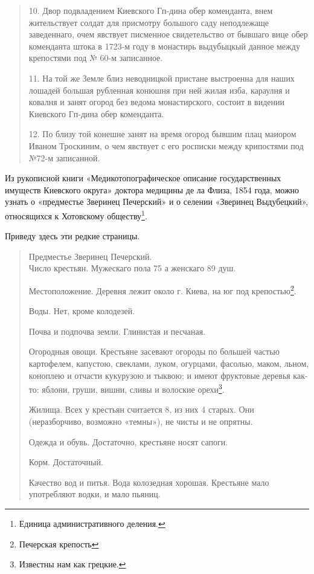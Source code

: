 \begin{quotation}
10. Двор подвладением Киевского Гп-дина обер коменданта, внем жительствует солдат для присмотру большого саду неподлежаще заведеннаго, очем явствует писменное свидетельство от бывшаго вице обер коменданта штока в 1723-м году в монастирь выдубыцкый данное между крепостями под № 60-м записанное.

11. На той же Земле близ неводницкой пристане выстроенна для наших лошадей большая рубленная конюшня при ней жилая изба, караулня и ковалня и занят огород без ведома монастирского, состоит в видении Киевского Гп-дина обер коменданта.

12. По близу той конешне занят на время огород бывшим плац маиором Иваном Троскиним, о чем явствует с его росписки между крипостями под №72-м записанной.
\end{quotation}

Из рукописной книги «Медикотопографическое описание государственных имуществ Киевского округа» доктора медицины де ла Флиза, 1854 года, можно узнать о «предместье Зверинец Печерский» и о селении «Зверинец Выдубецкий», относящихся к Хотовскому обществу\footnote{Единица административного деления.}.

Приведу здесь эти редкие страницы.

\begin{quotation}
Предместье Зверинец Печерский.\\

Число крестьян. Мужескаго пола 75 а женскаго 89 душ.

Местоположение. Деревня лежит около г. Киева, на юг под крепостью\footnote{Печерская крепость}.

Воды. Нет, кроме колодезей.

Почва и подпочва земли. Глинистая и песчаная.

Огородныя овощи. Крестьяне засевают огороды по большей частью картофелем, капустою, свеклами, луком, огурцами, фасолью, маком, льном, коноплею и отчасти кукурузою и тыквою; и имеют фруктовые деревья как-то: яблони, груши, вишни, сливы и волоские орехи\footnote{Известны нам как грецкие.}.

Жилища. Всех у крестьян считается 8, из них 4 старых. Они (неразборчиво, возможно «темны»), не чисты и не опрятны.

Одежда и обувь. Достаточно, крестьяне носят сапоги.

Корм. Достаточный.

Качество вод и питья. Вода колозедная хорошая. Крестьяне мало употребляют водки, и мало пьяниц.
\end{quotation}

